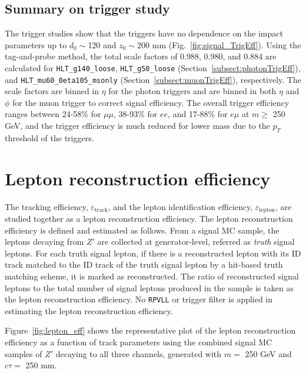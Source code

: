 \subsection{Summary on trigger study}
The trigger studies show that the triggers have no dependence on the impact parameters up to $d_{0}\sim$120 and $z_{0}\sim$200 mm (Fig.~\ref{fig:signal_TrigEff}). Using the tag-and-probe method, the total scale factors of 0.988, 0.980, and 0.884 are calculated for \texttt{HLT\_g140\_loose}, \texttt{HLT\_g50\_loose} (Section~\ref{subsect:photonTrigEff}), and \texttt{HLT\_mu60\_0eta105\_msonly} (Section~\ref{subsect:muonTrigEff}), respectively. The scale factors are binned in $\eta$ for the photon triggers and are binned in both $\eta$ and $\phi$ for the muon trigger to correct signal efficiency. The overall trigger efficiency ranges between 24-58\% for $\mu\mu$, 38-93\% for $ee$, and 17-88\% for $e\mu$ at $m\geq$ 250 GeV, and the trigger efficiency is much reduced for lower mass due to the $p_{T}$ threshold of the triggers.


\section{Lepton reconstruction efficiency}
\label{sec:tracking_efficiency}
The tracking efficiency, $\varepsilon_{\mathrm{track}}$, and the lepton identification efficiency, $\varepsilon_{\mathrm{lepton}}$, are studied together as a lepton reconstruction efficiency. The lepton reconstruction efficiency is defined and estimated as follows. From a signal MC sample, the leptons decaying from $Z'$ are collected at generator-level, referred as \textit{truth} signal leptons. For each truth signal lepton, if there is a reconstructed lepton with its ID track matched to the ID track of the truth signal lepton by a hit-based truth matching scheme, it is marked as reconstructed. The ratio of reconstructed signal leptons to the total number of signal leptons produced in the sample is taken as the lepton reconstruction efficiency. No \texttt{RPVLL} or trigger filter is applied in estimating the lepton reconstruction efficiency.

Figure~\ref{fig:lepton_eff} shows the representative plot of the lepton reconstruction efficiency as a function of track parameters using the combined signal MC samples of $Z'$ decaying to all three channels, generated with $m = $ 250 GeV and $c\tau=$ 250 mm.

